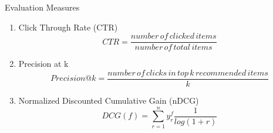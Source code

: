 \begin{frame}{Evaluation Measures}
    \begin{enumerate}
        \item Click Through Rate (CTR)
        \begin{equation}
            CTR = \frac{number\, of\, clicked\, items}{number\, of\, total\, items}
        \end{equation}
        \item Precision at k
        \begin{equation}
            Precision@k = \frac{number\, of\, clicks\, in\, top\, k\, recommended\, items}{k}
        \end{equation}

    \item Normalized Discounted Cumulative Gain (nDCG)
    \begin{equation}
        DCG(f) = \sum\limits_{r=1}^n y_r^f \frac{1}{log(1+r)}
    \end{equation}
    \end{enumerate}
\end{frame}